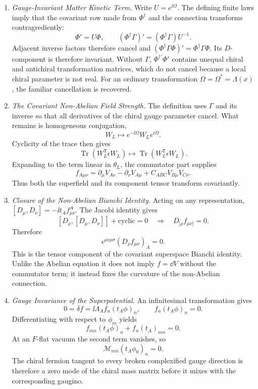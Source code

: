 \begin{enumerate}
  \begin{enumerate}
    \item \emph{Gauge-Invariant Matter Kinetic Term.}
    Write \(U=e^{\ii\Omega}\).  The defining finite laws imply that the
      covariant row made from \(\Phi^\dagger\) and the connection transforms
      contragrediently:
      \[
        \Phi'=U\Phi,\qquad
        (\Phi^\dagger\Gamma)'=(\Phi^\dagger\Gamma)U^{-1}.
      \]
      Adjacent inverse factors therefore cancel and
      \((\Phi^\dagger\Gamma\Phi)'=\Phi^\dagger\Gamma\Phi\).
      Its \(D\)-component is therefore invariant.  Without \(\Gamma\),
      \(\Phi^{\dagger\prime}\Phi'\) contains unequal chiral and antichiral
      transformation matrices, which do not cancel because a local chiral
      parameter is not real.  For an ordinary transformation
      \(\Omega=\Omega^*=\Lambda(x)\), the familiar cancellation is recovered.
    \item \emph{The Covariant Non-Abelian Field Strength.}
    The definition uses \(\Gamma\) and its inverse so that all derivatives of
      the chiral gauge parameter cancel.  What remains is homogeneous
      conjugation,
      \[
        W_L\longmapsto e^{-\ii\Omega}W_Le^{i\Omega}.
      \]
      Cyclicity of the trace then gives
      \[
        \operatorname{Tr}(W_L^{\mathsf T}\epsilon W_L)
          \longmapsto
        \operatorname{Tr}(W_L^{\mathsf T}\epsilon W_L).
      \]
      Expanding to the term linear in \(\theta_L\), the commutator part supplies
      \[
        f_{A\mu\nu}=\partial_\mu V_{A\nu}-\partial_\nu V_{A\mu}
          +C_{ABC}V_{B\mu}V_{C\nu}.
      \]
      Thus both the superfield and its component tensor transform covariantly.
    \item \emph{Closure of the Non-Abelian Bianchi Identity.}
    Acting on any representation,
      \([D_\mu,D_\nu]=-\ii t_Af^A_{\mu\nu}\).  The Jacobi identity gives
      \[
        [D_\rho,[D_\mu,D_\nu]]+\text{cyclic}=0
        \quad\Longrightarrow\quad D_{[\rho}f_{\mu\nu]}=0.
      \]
      Therefore
      \[
        \epsilon^{\mu\nu\rho\sigma}(D_\rho f_{\mu\nu})_A=0.
      \]
      This is the tensor component of the covariant superspace Bianchi
      identity.  Unlike the Abelian equation it does not imply
      \(f=\dd V\) without the commutator term; it instead fixes the curvature of
      the non-Abelian connection.
    \item \emph{Gauge Invariance of the Superpotential.}
    An infinitesimal transformation gives
      \[
        0=\delta f=\ii\Lambda_A f_n(t_A\phi)_n,
        \qquad f_n(t_A\phi)_n=0.
      \]
      Differentiating with respect to \(\phi_m\) yields
      \[
        f_{mn}(t_A\phi)_n+f_n(t_A)_{nm}=0.
      \]
      At an \(F\)-flat vacuum the second term vanishes, so
      \[
        \mathcal M_{mn}(t_A\phi_0)_n=0.
      \]
      The chiral fermion tangent to every broken complexified gauge direction
      is therefore a zero mode of the chiral mass matrix before it mixes with
      the corresponding gaugino.
  \end{enumerate}


\end{enumerate}

